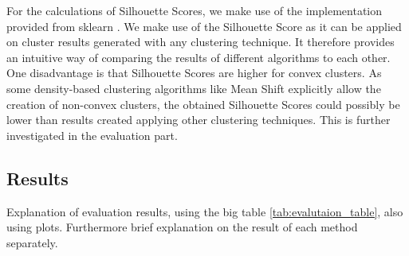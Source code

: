 For the calculations of Silhouette Scores, we make use of the implementation provided from sklearn \cite{sklearn_api}.
We make use of the Silhouette Score as it can be applied on cluster results generated with any clustering technique. It therefore provides an intuitive way of comparing the results of different algorithms to each other. One disadvantage is that Silhouette Scores are higher for convex clusters. As some density-based clustering algorithms like Mean Shift explicitly allow the creation of non-convex clusters, the obtained Silhouette Scores could possibly be lower than results created applying other clustering techniques. This is further investigated in the evaluation part. 

\subsection{Results}

Explanation of evaluation results, using the big table \ref{tab:evalutaion_table}, also using plots. Furthermore brief explanation on the result of each method separately. 

